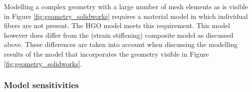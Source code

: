 \qquad Modelling a complex geometry with a large number of mesh elements as is visible in Figure \ref{fig:geometry_solidworks} requires a material model in which individual fibers are not present. The HGO model meets this requirement. This model however does differ from the (strain stiffening) composite model as discussed above. These differences are taken into account when discussing the modelling results of the model that incorporates the geometry visible in Figure \ref{fig:geometry_solidworks}.\\









\subsubsection{Model sensitivities}\label{sec:HGO_model_sensitivities}




